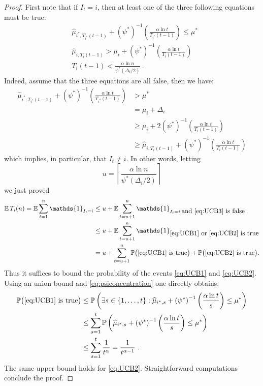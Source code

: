 \documentclass[11pt]{hackednow}
\renewcommand{\P}{\mathbb{P}}
\newcommand{\E}{\mathbb{E}}
\def\ds1{\mathds{1}}
\newcommand{\wh}{\widehat}
\begin{document}
\begin{proof}
First note that if $I_t = i$, then at least one of the three following equations must be true:
\begin{align}
\label{eq:UCB1}
& \wh{\mu}_{i^*,T_{i^*}(t-1)} + \left(\psi^*\right)^{-1}\left( \frac{\alpha \ln t}{T_{i^*}(t-1)}\right) \leq \mu^*
\\
\label{eq:UCB2}
& \widehat{\mu}_{i,T_i(t-1)} > \mu_i + \left(\psi^*\right)^{-1}\left( \frac{\alpha \ln t}{T_{i}(t-1)}\right)
\\
\label{eq:UCB3}
& T_i(t-1) < \frac{\alpha \ln n}{\psi^*(\Delta_i/2)}~.
\end{align}
Indeed, assume that the three equations are all false, then we have:
\begin{align*}
\wh{\mu}_{i^*,T_{i^*}(t-1)} + \left(\psi^*\right)^{-1}\left( \frac{\alpha \ln t}{T_{i^*}(t-1)}\right) & > \mu^* \\
& = \mu_i+\Delta_i  \\
& \geq \mu_i + 2 \left(\psi^*\right)^{-1}\left( \frac{\alpha \ln t}{T_{i}(t-1)}\right) \\
& \geq \widehat{\mu}_{i,T_i(t-1)} + \left(\psi^*\right)^{-1}\left( \frac{\alpha \ln t}{T_{i}(t-1)}\right)
\end{align*}
which implies, in particular, that $I_t \neq i$. In other words, letting
\[
    u = \left\lceil \frac{\alpha \ln n}{\psi^*(\Delta_i/2)} \right\rceil
\]
we just proved
\begin{align*}
\E\,T_i(n) = \E \sum_{t=1}^n \ds1_{I_t=i} & \leq u + \E \sum_{t=u+1}^n \ds1_{I_t = i \; \mbox{and \eqref{eq:UCB3} is false}} \\
& \leq u + \E \sum_{t=u+1}^n \ds1_{\mbox{\eqref{eq:UCB1} or \eqref{eq:UCB2} is true}} \\
& = u + \sum_{t=u+1}^n \P\bigl(\mbox{\eqref{eq:UCB1} is true}\bigr) + \P\bigl(\mbox{\eqref{eq:UCB2} is true}\bigr).
\end{align*}
Thus it suffices to bound the probability of the events \eqref{eq:UCB1} and \eqref{eq:UCB2}. Using an union bound and \eqref{eq:psiconcentration} one directly obtains:
\begin{align*}
\P\bigl(\mbox{\eqref{eq:UCB1} is true}\bigr) & \leq \P\left(\exists s \in \{1,\hdots,t\} : \wh{\mu}_{i^*,s} + \left(\psi^*\right)^{-1}\left( \frac{\alpha \ln t}{s}\right)  \leq \mu^* \right) \\
& \leq \sum_{s=1}^t \P\left(\wh{\mu}_{i^*,s} + \left(\psi^*\right)^{-1}\left( \frac{\alpha \ln t}{s}\right)  \leq \mu^* \right) \\
& \leq \sum_{s=1}^t \frac{1}{t^{\alpha}}
= \frac{1}{t^{\alpha - 1}}~. 
\end{align*}
The same upper bound holds for \eqref{eq:UCB2}. Straightforward computations conclude the proof.
\end{proof}
\end{document}
